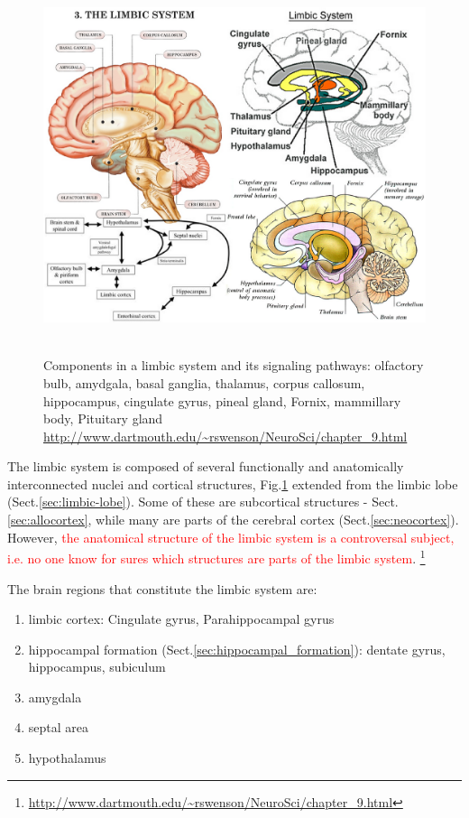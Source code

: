\begin{figure}[hbtp]
  \centerline{\includegraphics[height=11cm,
    angle=0]{./images/limbic_system_3.eps}}
  \caption{Components in a limbic system and its signaling pathways:
  olfactory bulb, amydgala, basal ganglia, thalamus, corpus callosum,
  hippocampus, 	cingulate gyrus, pineal gland, Fornix, mammillary body, 
  Pituitary gland
  \url{http://www.dartmouth.edu/~rswenson/NeuroSci/chapter_9.html}}
\label{fig:limbic}
\end{figure}

The limbic system is composed of several functionally and anatomically
interconnected nuclei and cortical structures, Fig.\ref{fig:limbic} extended
from the limbic lobe (Sect.\ref{sec:limbic-lobe}).
Some of these are subcortical structures  - Sect.\ref{sec:allocortex}, while
many are parts of the cerebral cortex (Sect.\ref{sec:neocortex}). However,
\textcolor{red}{the anatomical structure of the limbic system is a controversal
subject, i.e. no one know for sures which structures are parts of the limbic
system}.
\footnote{\url{http://www.dartmouth.edu/~rswenson/NeuroSci/chapter_9.html}}

The brain regions that constitute the limbic system are:
\begin{enumerate}
  \item limbic cortex: Cingulate gyrus, Parahippocampal gyrus
  \item hippocampal formation (Sect.\ref{sec:hippocampal_formation}): dentate
  gyrus, hippocampus, subiculum 
  \item amygdala
  \item septal area
  \item hypothalamus
\end{enumerate}

